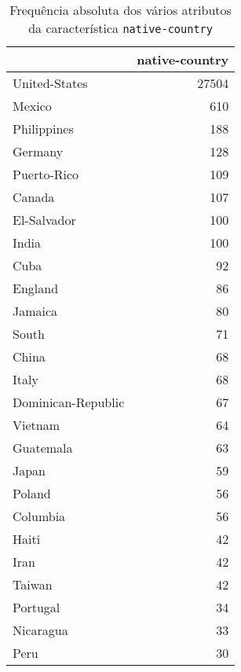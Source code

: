 \begin{table}
\centering
\caption{Frequência absoluta dos vários atributos da característica \texttt{native-country}}
\begin{tabular}{lr}
\toprule
{} &  native-country \\
\midrule
 United-States              &           27504 \\
 Mexico                     &             610 \\
 Philippines                &             188 \\
 Germany                    &             128 \\
 Puerto-Rico                &             109 \\
 Canada                     &             107 \\
 El-Salvador                &             100 \\
 India                      &             100 \\
 Cuba                       &              92 \\
 England                    &              86 \\
 Jamaica                    &              80 \\
 South                      &              71 \\
 China                      &              68 \\
 Italy                      &              68 \\
 Dominican-Republic         &              67 \\
 Vietnam                    &              64 \\
 Guatemala                  &              63 \\
 Japan                      &              59 \\
 Poland                     &              56 \\
 Columbia                   &              56 \\
 Haiti                      &              42 \\
 Iran                       &              42 \\
 Taiwan                     &              42 \\
 Portugal                   &              34 \\
 Nicaragua                  &              33 \\
 Peru                       &              30 \\

\end{tabular}
\end{table}
